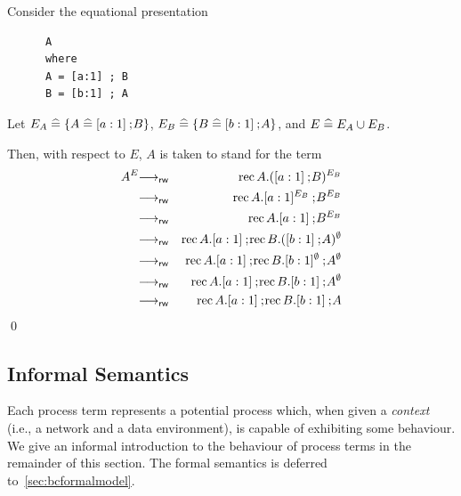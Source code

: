 \pagebreak
\begin{exampleb}
Consider the equational presentation
\begin{verbatim}
      A
      where
      A = [a:1] ; B
      B = [b:1] ; A
\end{verbatim}
Let $E_A \mathrel{\widehat=} \{A \mathrel{\widehat=} [a:1] \mathbin{\mathrm{;}\!} B\}$, $E_B \mathrel{\widehat=} \{B \mathrel{\widehat=} [b:1] \mathbin{\mathrm{;}\!} A\}$,
and $E \mathrel{\widehat=} E_A \cup E_B$.

Then, with respect to $E$, $A$ is taken to stand for the term
\begin{eqnarray*}
A^E & \goesrw & \rec A . ([a:1] \sq B)^{E_B} \\
    & \goesrw & \rec A . [a:1]^{E_B} \sq B^{E_B} \\
    & \goesrw & \rec A . [a:1] \sq B^{E_B} \\
    & \goesrw & \rec A . [a:1] \sq \rec B . ([b:1] \sq A)^\emptyset \\
    & \goesrw & \rec A . [a:1] \sq \rec B . [b:1]^\emptyset \sq A^\emptyset \\
    & \goesrw & \rec A . [a:1] \sq \rec B . [b:1] \sq A^\emptyset \\
    & \goesrw & \rec A . [a:1] \sq \rec B . [b:1] \sq A
\end{eqnarray*} 
\qed
\end{exampleb}

\subsection{Informal Semantics}
Each process term represents a potential process which, when given a
\emph{context} (i.e., a network and a data environment), is capable of
exhibiting some behaviour. We give an informal introduction to the
behaviour of process terms in the remainder of this section. The
formal semantics is deferred to~\Sec\ref{sec:bcformalmodel}.

